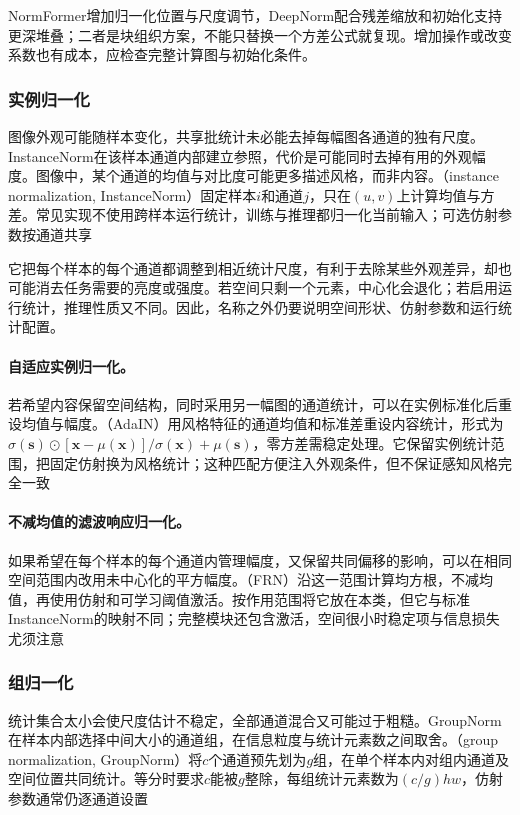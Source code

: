 NormFormer增加归一化位置与尺度调节，DeepNorm配合残差缩放和初始化支持更深堆叠；二者是块组织方案，不能只替换一个方差公式就复现。增加操作或改变系数也有成本，应检查完整计算图与初始化条件。

\subsubsection{实例归一化}
\label{sec:training-instancenorm}
\label{sec:training-adaptive-instancenorm}
\label{sec:training-frn-pixelnorm}
\label{sec:training-frn}
图像外观可能随样本变化，共享批统计未必能去掉每幅图各通道的独有尺度。InstanceNorm在该样本通道内部建立参照，代价是可能同时去掉有用的外观幅度。图像中，某个通道的均值与对比度可能更多描述风格，而非内容。（instance normalization, InstanceNorm）固定样本$i$和通道$j$，只在$(u,v)$上计算均值与方差。常见实现不使用跨样本运行统计，训练与推理都归一化当前输入；可选仿射参数按通道共享

它把每个样本的每个通道都调整到相近统计尺度，有利于去除某些外观差异，却也可能消去任务需要的亮度或强度。若空间只剩一个元素，中心化会退化；若启用运行统计，推理性质又不同。因此，名称之外仍要说明空间形状、仿射参数和运行统计配置。

\paragraph{自适应实例归一化。}

若希望内容保留空间结构，同时采用另一幅图的通道统计，可以在实例标准化后重设均值与幅度。（AdaIN）用风格特征的通道均值和标准差重设内容统计，形式为$\sigma(\bm s)\odot[\bm x-\mu(\bm x)]/\sigma(\bm x)+\mu(\bm s)$，零方差需稳定处理。它保留实例统计范围，把固定仿射换为风格统计；这种匹配方便注入外观条件，但不保证感知风格完全一致

\paragraph{不减均值的滤波响应归一化。}

如果希望在每个样本的每个通道内管理幅度，又保留共同偏移的影响，可以在相同空间范围内改用未中心化的平方幅度。（FRN）沿这一范围计算均方根，不减均值，再使用仿射和可学习阈值激活。按作用范围将它放在本类，但它与标准InstanceNorm的映射不同；完整模块还包含激活，空间很小时稳定项与信息损失尤须注意

\subsubsection{组归一化}
\label{sec:training-groupnorm}
\label{sec:training-instance-groupnorm}
\label{sec:training-evonorm}
统计集合太小会使尺度估计不稳定，全部通道混合又可能过于粗糙。GroupNorm在样本内部选择中间大小的通道组，在信息粒度与统计元素数之间取舍。（group normalization, GroupNorm）将$c$个通道预先划为$g$组，在单个样本内对组内通道及空间位置共同统计。等分时要求$c$能被$g$整除，每组统计元素数为$(c/g)hw$，仿射参数通常仍逐通道设置

